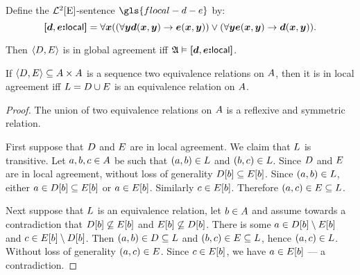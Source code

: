 \begin{definition}
Define the $\mathcal{L}^{2}[\mathrm{E}]$-sentence $\gls{flocal-d-e}$ by:
\[
{\bm{[}\bm{d},\bm{e}\mathord{\bm{:}}\mathsf{local}\bm{]}} =
    \forall \bm{x} 
    ((\forall \bm{y} \bm{d}(\bm{x},\bm{y}) \rightarrow \bm{e}(\bm{x},\bm{y}))
    \lor 
    (\forall \bm{y} \bm{e}(\bm{x},\bm{y}) \rightarrow \bm{d}(\bm{x},\bm{y})).
\]
\end{definition}
Then $\left\langle D, E \right\rangle$ is in global agreement iff
$\mathfrak{A} \vDash {\bm{[}\bm{d},\bm{e}\mathord{\bm{:}}\mathsf{local}\bm{]}}$.

\begin{lemma}\label{lem:local-2}
If $\left\langle D, E \right\rangle \subseteq {A\times A}$ is a sequence two
equivalence relations on $A$, then
it is in local agreement iff $L = D \cup E$ is an equivalence
relation on $A$.
\end{lemma}
\begin{proof}
The union of two equivalence relations on $A$ is a reflexive and symmetric
relation.

First suppose that $D$ and $E$ are in local agreement.
We claim that $L$ is transitive.
Let $a, b, c \in A$ be such that $(a, b) \in L$ and 
$(b, c) \in L$.
Since $D$ and $E$ are in local agreement,
without loss of generality $D[b] \subseteq E[b]$.
Since $(a, b) \in L$, either $a \in D[b] \subseteq E[b]$
or $a \in E[b]$.
Similarly $c \in E[b]$.
Therefore $(a, c) \in E \subseteq L$.
    
Next suppose that $L$ is an equivalence relation, let $b \in A$ and
assume towards a contradiction
that $D[b] \not\subseteq E[b]$ and $E[b] \not\subseteq
D[b]$.
There is some $a \in D[b] \setminus E[b]$ and $c \in E[b]
\setminus D[b]$.
Then $(a, b) \in D \subseteq L$ and $(b, c) \in E \subseteq
L$, hence $(a, c) \in L$.
Without loss of generality $(a, c) \in E$.
Since $c \in E[b]$, we have $a \in E[b]$ --- a contradiction.
\end{proof}